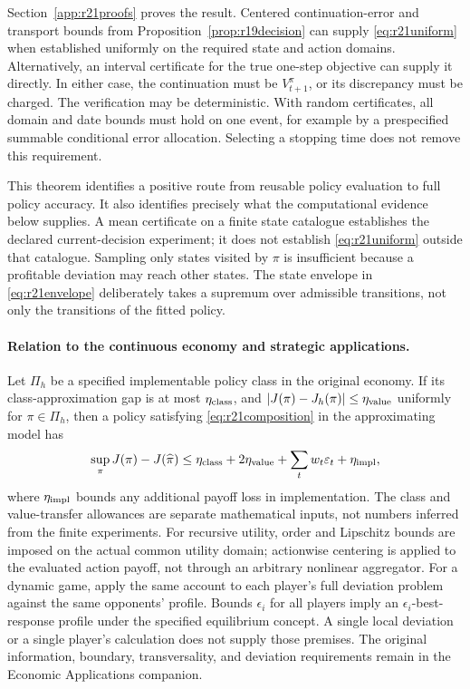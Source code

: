 Section~\ref{app:r21proofs} proves the result. Centered continuation-error
and transport bounds from Proposition~\ref{prop:r19decision} can supply
\eqref{eq:r21uniform} when established uniformly on the required state and
action domains. Alternatively, an interval certificate for the true
one-step objective can supply it directly. In either case, the continuation
must be $V_{t+1}^\pi$, or its discrepancy must be charged. The verification
may be deterministic. With random certificates, all domain and date bounds
must hold on one event, for example by a prespecified summable conditional
error allocation. Selecting a stopping time does not remove this requirement.

This theorem identifies a positive route from reusable policy evaluation to
full policy accuracy. It also identifies precisely what the computational
evidence below supplies. A mean certificate on a finite state catalogue
establishes the declared current-decision experiment; it does not establish
\eqref{eq:r21uniform} outside that catalogue. Sampling only states visited by
$\pi$ is insufficient because a profitable deviation may reach other states.
The state envelope in \eqref{eq:r21envelope} deliberately takes a supremum
over admissible transitions, not only the transitions of the fitted policy.

\paragraph{Relation to the continuous economy and strategic applications.}
Let $\Pi_h$ be a specified implementable policy class in the original economy.
If its class-approximation gap is at most $\eta_{\rm class}$, and
$|J(\pi)-J_h(\pi)|\leq\eta_{\rm value}$ uniformly for $\pi\in\Pi_h$, then a
policy satisfying \eqref{eq:r21composition} in the approximating model has
\begin{equation}
 \sup_{\pi}J(\pi)-J(\widehat\pi)
 \leq\eta_{\rm class}+2\eta_{\rm value}
       +\sum_t w_t\varepsilon_t+\eta_{\rm impl},
 \label{eq:r21bridge}
\end{equation}
where $\eta_{\rm impl}$ bounds any additional payoff loss in implementation.
The class and value-transfer allowances are separate mathematical inputs,
not numbers inferred from the finite experiments. For recursive utility,
order and Lipschitz bounds are imposed on the actual common utility domain;
actionwise centering is applied to the evaluated action payoff, not through
an arbitrary nonlinear aggregator. For a dynamic game, apply the same
account to each player's full deviation problem against the same opponents'
profile. Bounds $\epsilon_i$ for all players imply an $\epsilon_i$-best-response
profile under the specified equilibrium concept. A single local deviation
or a single player's calculation does not supply those premises. The original
information, boundary, transversality, and deviation requirements remain in
the Economic Applications companion.

